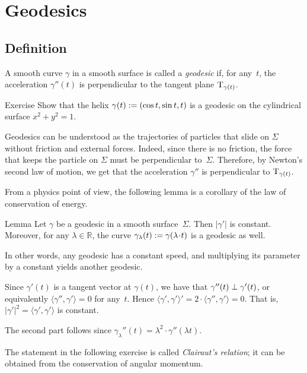 \chapter{Geodesics}
\label{chap:geodesics}


\section{Definition}

A smooth curve $\gamma$ in a smooth surface is called a \emph{geodesic} if, for any~$t$, the acceleration $\gamma''(t)$ is perpendicular to the tangent plane $\mathrm{T}_{\gamma(t)}$.

\begin{thm}{Exercise}\label{ex:helix-geodesic}
Show that the helix $\gamma(t)\z\df(\cos t,\sin t, t)$ is a geodesic on the cylindrical surface $x^2+y^2=1$.
\end{thm}


Geodesics can be understood as the trajectories of particles that slide on $\Sigma$ without friction and external forces.
Indeed, since there is no friction, the force that keeps the particle on $\Sigma$ must be perpendicular to~$\Sigma$.
Therefore, by Newton's second law of motion,
we get that the acceleration $\gamma''$ is perpendicular to $\mathrm{T}_{\gamma(t)}$.

From a physics point of view, the following lemma is a corollary of the law of conservation of energy.


\begin{thm}{Lemma}\label{lem:constant-speed}
Let $\gamma$ be a geodesic in a smooth surface~$\Sigma$. 
Then $|\gamma'|$ is constant.
Moreover, for any $\lambda\in\mathbb{R}$, the curve 
$\gamma_{\lambda}(t)\df \gamma (\lambda\cdot t)$ is a geodesic as well. 
\end{thm}

In other words, any geodesic has a constant speed, and multiplying its parameter by a constant yields another geodesic.

Since $\gamma'(t)$ is a tangent vector at $\gamma(t)$,
we have that $\gamma''(t)\z\perp\gamma'(t)$, or equivalently $\langle\gamma'',\gamma'\rangle=0$ for any~$t$.
Hence 
$\langle\gamma',\gamma'\rangle'=2\cdot \langle\gamma'',\gamma'\rangle=0$.
That is, $|\gamma'|^2=\langle\gamma',\gamma'\rangle$ is constant.

The second part follows since 
$\gamma_{\lambda}''(t) =\lambda^2\cdot \gamma''(\lambda t)$.
\qeds


The statement in the following exercise is called \emph{Clairaut's relation};
it can be obtained from the conservation of angular momentum.

